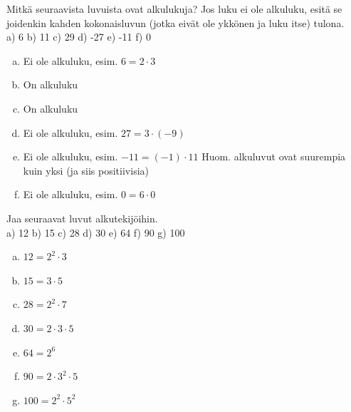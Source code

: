     \begin{tehtava}
    Mitkä seuraavista luvuista ovat alkulukuja? Jos luku ei ole alkuluku, esitä se joidenkin kahden kokonaisluvun (jotka eivät ole ykkönen ja luku itse) tulona.\\
    a) 6 \quad b) 11 \quad c) 29 \quad d) -27 \quad e) -11 \quad f) 0
    
    \begin{vastaus}
    \begin{enumerate}[a)]
    	\item Ei ole alkuluku, esim. $6 = 2 \cdot 3$
    	\item On alkuluku
    	\item On alkuluku
    	\item Ei ole alkuluku, esim. $27 = 3 \cdot (-9)$
    	\item Ei ole alkuluku, esim. $-11 = (-1) \cdot 11$ Huom. alkuluvut ovat suurempia kuin yksi (ja siis positiivisia)
    	\item Ei ole alkuluku, esim. $0 = 6 \cdot 0$
    \end{enumerate}
    \end{vastaus}
    \end{tehtava}
    
    \begin{tehtava}
    Jaa seuraavat luvut alkutekijöihin.\\
    a) 12 \quad b) 15 \quad c) 28 \quad d) 30 \quad e) 64 \quad f) 90 \quad g) 100
    
    \begin{vastaus}
    \begin{enumerate}[a)]
    	\item $12 = 2^2 \cdot 3$
    	\item $15 = 3 \cdot 5$
    	\item $28 = 2^2 \cdot 7$
    	\item $30 = 2 \cdot 3 \cdot 5$
    	\item $64 = 2^6$
    	\item $90 = 2 \cdot 3^2 \cdot 5$
    	\item $100 = 2^2 \cdot 5^2$
    \end{enumerate}
    \end{vastaus}
    \end{tehtava}
